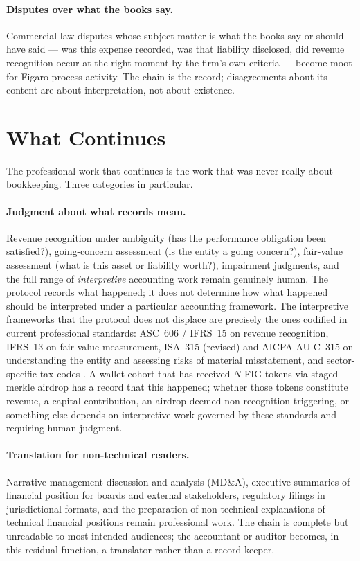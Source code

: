 \documentclass[11pt,a4paper]{article}
\theoremstyle{definition}
\theoremstyle{remark}
\begin{document}
\paragraph{Disputes over what the books say.}
Commercial-law disputes whose subject matter is what the
books say or should have said --- was this expense recorded,
was that liability disclosed, did revenue recognition occur
at the right moment by the firm's own criteria --- become
moot for Figaro-process activity. The chain is the record;
disagreements about its content are about interpretation, not
about existence.

\section{What Continues}
\label{sec:continues}

The professional work that continues is the work that was
never really about bookkeeping. Three categories in
particular.

\paragraph{Judgment about what records mean.}
Revenue recognition under ambiguity (has the performance
obligation been satisfied?), going-concern assessment (is the
entity a going concern?), fair-value assessment (what is
this asset or liability worth?), impairment judgments, and
the full range of \emph{interpretive} accounting work remain
genuinely human. The protocol records what happened; it does
not determine how what happened should be interpreted under
a particular accounting framework. The interpretive frameworks
that the protocol does not displace are precisely the ones
codified in current professional standards: ASC~606 / IFRS~15
on revenue recognition, IFRS~13 on fair-value measurement,
ISA~315 (revised) and AICPA AU-C~315 on understanding the
entity and assessing risks of material misstatement, and
sector-specific tax codes \citep{aicpa2020auc315,
fasbasc606, ifrs2014ifrs15}. A wallet cohort that has received
$N$ FIG tokens via staged merkle airdrop has a record that
this happened; whether those tokens constitute revenue, a
capital contribution, an airdrop deemed non-recognition-triggering,
or something else depends on interpretive work governed by these
standards and requiring human judgment.

\paragraph{Translation for non-technical readers.}
Narrative management discussion and analysis (MD\&A),
executive summaries of financial position for boards and
external stakeholders, regulatory filings in jurisdictional
formats, and the preparation of non-technical explanations
of technical financial positions remain professional work.
The chain is complete but unreadable to most intended
audiences; the accountant or auditor becomes, in this
residual function, a translator rather than a
record-keeper.
\end{document}
